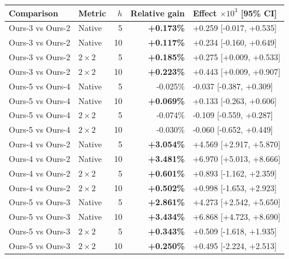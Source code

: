 \begin{table}[H]
\centering\small
\setlength{\tabcolsep}{4pt}
\begin{tabular}{@{}llrrl@{}}
\toprule Comparison & Metric & $h$ & Relative gain & Effect $\times10^3$ [95\% CI] \\
\midrule
Ours-3 vs Ours-2 & Native & 5 & \textcolor{gainpositive}{\textbf{+0.173\%}} & +0.259 [-0.017, +0.535] \\
Ours-3 vs Ours-2 & Native & 10 & \textcolor{gainpositive}{\textbf{+0.117\%}} & +0.234 [-0.160, +0.649] \\
Ours-3 vs Ours-2 & $2\!\times\!2$ & 5 & \textcolor{gainpositive}{\textbf{+0.185\%}} & +0.275 [+0.009, +0.533] \\
Ours-3 vs Ours-2 & $2\!\times\!2$ & 10 & \textcolor{gainpositive}{\textbf{+0.223\%}} & +0.443 [+0.009, +0.907] \\
\midrule
Ours-5 vs Ours-4 & Native & 5 & -0.025\% & -0.037 [-0.387, +0.309] \\
Ours-5 vs Ours-4 & Native & 10 & \textcolor{gainpositive}{\textbf{+0.069\%}} & +0.133 [-0.263, +0.606] \\
Ours-5 vs Ours-4 & $2\!\times\!2$ & 5 & -0.074\% & -0.109 [-0.559, +0.287] \\
Ours-5 vs Ours-4 & $2\!\times\!2$ & 10 & -0.030\% & -0.060 [-0.652, +0.449] \\
\midrule
Ours-4 vs Ours-2 & Native & 5 & \textcolor{gainpositive}{\textbf{+3.054\%}} & +4.569 [+2.917, +5.870] \\
Ours-4 vs Ours-2 & Native & 10 & \textcolor{gainpositive}{\textbf{+3.481\%}} & +6.970 [+5.013, +8.666] \\
Ours-4 vs Ours-2 & $2\!\times\!2$ & 5 & \textcolor{gainpositive}{\textbf{+0.601\%}} & +0.893 [-1.162, +2.359] \\
Ours-4 vs Ours-2 & $2\!\times\!2$ & 10 & \textcolor{gainpositive}{\textbf{+0.502\%}} & +0.998 [-1.653, +2.923] \\
\midrule
Ours-5 vs Ours-3 & Native & 5 & \textcolor{gainpositive}{\textbf{+2.861\%}} & +4.273 [+2.542, +5.650] \\
Ours-5 vs Ours-3 & Native & 10 & \textcolor{gainpositive}{\textbf{+3.434\%}} & +6.868 [+4.723, +8.690] \\
Ours-5 vs Ours-3 & $2\!\times\!2$ & 5 & \textcolor{gainpositive}{\textbf{+0.343\%}} & +0.509 [-1.618, +1.935] \\
Ours-5 vs Ours-3 & $2\!\times\!2$ & 10 & \textcolor{gainpositive}{\textbf{+0.250\%}} & +0.495 [-2.224, +2.513] \\

\end{tabular}
\end{table}
